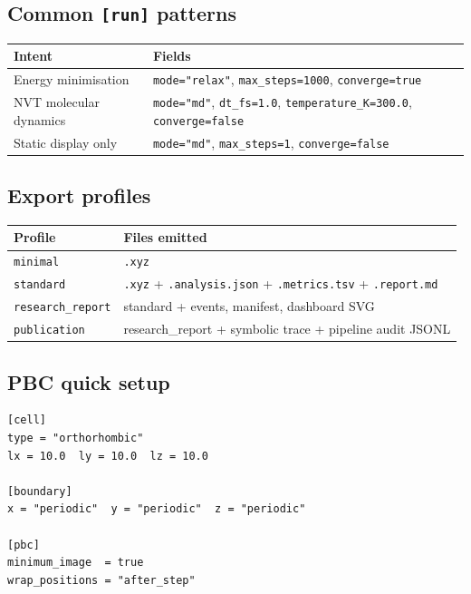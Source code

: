 \documentclass[11pt,a4paper]{article}
\begin{document}
\subsection*{Common \texttt{[run]} patterns}

\begin{center}
\footnotesize
\begin{tabular}{@{}ll@{}}
\toprule
Intent & Fields \\
\midrule
Energy minimisation  & \texttt{mode="relax"}, \texttt{max\_steps=1000}, \texttt{converge=true} \\
NVT molecular dynamics & \texttt{mode="md"}, \texttt{dt\_fs=1.0}, \texttt{temperature\_K=300.0}, \texttt{converge=false} \\
Static display only  & \texttt{mode="md"}, \texttt{max\_steps=1}, \texttt{converge=false} \\
\bottomrule
\end{tabular}
\end{center}

\subsection*{Export profiles}

\begin{center}
\footnotesize
\begin{tabular}{@{}ll@{}}
\toprule
Profile & Files emitted \\
\midrule
\texttt{minimal}         & \texttt{.xyz} \\
\texttt{standard}        & \texttt{.xyz} + \texttt{.analysis.json} + \texttt{.metrics.tsv} + \texttt{.report.md} \\
\texttt{research\_report}& standard + events, manifest, dashboard SVG \\
\texttt{publication}     & research\_report + symbolic trace + pipeline audit JSONL \\
\bottomrule
\end{tabular}
\end{center}

\subsection*{PBC quick setup}
\begin{tcolorbox}[scriptbox]
\begin{lstlisting}[style=vsimlst]
[cell]
type = "orthorhombic"
lx = 10.0  ly = 10.0  lz = 10.0

[boundary]
x = "periodic"  y = "periodic"  z = "periodic"

[pbc]
minimum_image  = true
wrap_positions = "after_step"
\end{lstlisting}
\end{tcolorbox}
\end{document}
